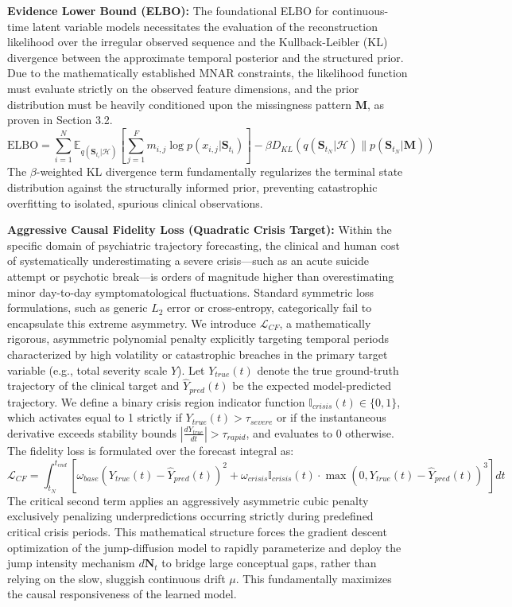 \textbf{Evidence Lower Bound (ELBO):} The foundational ELBO for continuous-time latent variable models necessitates the evaluation of the reconstruction likelihood over the irregular observed sequence and the Kullback-Leibler (KL) divergence between the approximate temporal posterior and the structured prior. Due to the mathematically established MNAR constraints, the likelihood function must evaluate strictly on the observed feature dimensions, and the prior distribution must be heavily conditioned upon the missingness pattern $\mathbf{M}$, as proven in Section 3.2.
\begin{equation}
\text{ELBO} = \sum_{i=1}^N \mathbb{E}_{q(\mathbf{S}_{t_i} | \mathcal{H})} \left[ \sum_{j=1}^F m_{i,j} \log p(x_{i,j} | \mathbf{S}_{t_i}) \right] - \beta D_{KL} \left( q(\mathbf{S}_{t_N} | \mathcal{H}) \parallel p(\mathbf{S}_{t_N} | \mathbf{M}) \right)
\end{equation}
The $\beta$-weighted KL divergence term fundamentally regularizes the terminal state distribution against the structurally informed prior, preventing catastrophic overfitting to isolated, spurious clinical observations.

\textbf{Aggressive Causal Fidelity Loss (Quadratic Crisis Target):} Within the specific domain of psychiatric trajectory forecasting, the clinical and human cost of systematically underestimating a severe crisis—such as an acute suicide attempt or psychotic break—is orders of magnitude higher than overestimating minor day-to-day symptomatological fluctuations. Standard symmetric loss formulations, such as generic $L_2$ error or cross-entropy, categorically fail to encapsulate this extreme asymmetry. We introduce $\mathcal{L}_{CF}$, a mathematically rigorous, asymmetric polynomial penalty explicitly targeting temporal periods characterized by high volatility or catastrophic breaches in the primary target variable (e.g., total severity scale $Y$).
Let $Y_{true}(t)$ denote the true ground-truth trajectory of the clinical target and $\hat{Y}_{pred}(t)$ be the expected model-predicted trajectory. We define a binary crisis region indicator function $\mathbb{I}_{crisis}(t) \in \{0, 1\}$, which activates equal to 1 strictly if $Y_{true}(t) > \tau_{severe}$ or if the instantaneous derivative exceeds stability bounds $\left| \frac{d Y_{true}}{dt} \right| > \tau_{rapid}$, and evaluates to 0 otherwise.
The fidelity loss is formulated over the forecast integral as:
\begin{equation}
\mathcal{L}_{CF} = \int_{t_N}^{t_{end}} \left[ \omega_{base} \left( Y_{true}(t) - \hat{Y}_{pred}(t) \right)^2 + \omega_{crisis} \mathbb{I}_{crisis}(t) \cdot \max\left(0, Y_{true}(t) - \hat{Y}_{pred}(t)\right)^3 \right] dt
\end{equation}
The critical second term applies an aggressively asymmetric cubic penalty exclusively penalizing underpredictions occurring strictly during predefined critical crisis periods. This mathematical structure forces the gradient descent optimization of the jump-diffusion model to rapidly parameterize and deploy the jump intensity mechanism $d\mathbf{N}_t$ to bridge large conceptual gaps, rather than relying on the slow, sluggish continuous drift $\mu$. This fundamentally maximizes the causal responsiveness of the learned model.

